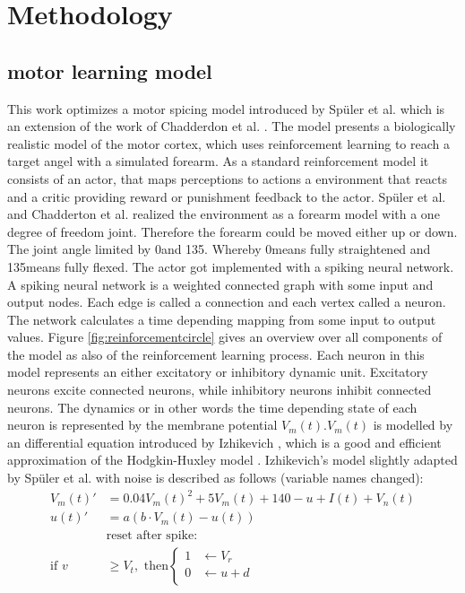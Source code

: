 \chapter{Methodology}\label{Methodology}
\section{motor learning model}
This work optimizes a motor spicing model introduced by Spüler et al. \cite{sebastianPaper}\cite{sebastianPaper} which is an extension of the work of Chadderdon et al. \cite{chadderdonNeuronalModel}. The model presents a biologically realistic model of the motor cortex, which uses reinforcement learning to reach a target angel with a simulated forearm.
As a standard reinforcement model \cite{reinforcementlearning}\cite{chadderdonNeuronalModel} it consists of an actor, that maps perceptions to actions a environment that reacts and a critic providing reward or punishment feedback to the actor. Spüler et al. and Chadderton et al. realized the environment as a forearm model with a one degree of freedom joint. Therefore the forearm could be moved either up or down. The joint angle limited by 0\degree and 135\degree. Whereby 0\degree means fully straightened and 135\degree means fully flexed. The actor got implemented with a spiking neural network. A spiking neural network is a weighted connected graph with some input and output nodes. Each edge is called a connection and each vertex called a neuron. The network calculates a time depending mapping from some input to output values.
Figure \ref{fig:reinforcementcircle} gives an overview over all components of the model as also of the reinforcement learning process.
Each neuron in this model represents an either excitatory or inhibitory dynamic unit. Excitatory neurons excite connected neurons, while inhibitory neurons inhibit connected neurons.
The dynamics or in other words the time depending state of each neuron is represented by the membrane potential $V_m(t)$.$V_m(t)$ is modelled by an differential equation introduced by Izhikevich \cite{izhikevichSimpleModel}, which is a good and efficient approximation of the Hodgkin-Huxley model \cite{hodgkinHuxleyModel}. Izhikevich's model slightly adapted by Spüler et al. with noise is described as follows (variable names changed):
\begin{align*}
	V_m(t)' &= 0.04 V_m(t)^2+5V_m(t)+140-u+I(t)+V_n(t)\\
	u(t)' &= a(b\cdot V_m(t)-u(t))\\
	&\text{reset after spike:}\\
	\text{if } v&\geq V_t,\text{ then}
	\begin{cases}
	1 & \leftarrow V_r\\
	0 & \leftarrow u+d\\
	\end{cases} 
\end{align*}
